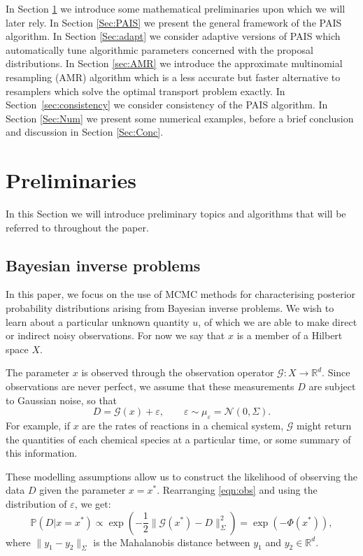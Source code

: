 \documentclass[final]{siamltex}
\newcommand{\G}{\mathcal{G}}
\newcommand{\data}{D}
\begin{document}
In Section \ref{Sec:Prelim} we introduce some mathematical
preliminaries upon which we will later rely. In Section \ref{Sec:PAIS}
we present the general framework of the PAIS algorithm. In Section
\ref{Sec:adapt} we consider adaptive versions of PAIS which
automatically tune algorithmic parameters concerned with the proposal
distributions. In Section \ref{sec:AMR} we introduce the approximate
multinomial resampling (AMR) algorithm which is a less accurate but
faster alternative to resamplers which solve the optimal transport
problem exactly. In Section~\ref{sec:consistency} we consider
consistency of the PAIS algorithm. In Section \ref{Sec:Num} we present
some numerical examples, before a brief conclusion and discussion in
Section \ref{Sec:Conc}.

\section{Preliminaries}\label{Sec:Prelim}
In this Section we will introduce preliminary topics and algorithms
that will be referred to throughout the paper.
\subsection{Bayesian inverse problems}
In this paper, we focus on the use of MCMC methods for characterising
posterior probability distributions arising from Bayesian inverse problems. We
wish to learn about a particular unknown quantity $u$, of which we are
able to make direct or indirect noisy observations. For now
we say that $x$ is a member of a Hilbert
space $X$. 

The parameter $x$ is observed
through the observation operator $\mathcal{G}:X \to\mathbb{R}^d$. 
Since observations are never perfect, we
assume that these measurements $\data$ are subject to Gaussian noise,
so that
\begin{equation}\label{eqn:obs}
	\data = \mathcal{G}(x) + \varepsilon, \qquad \varepsilon \sim \mu_{\varepsilon} = \mathcal{N}(0,\Sigma).
\end{equation}
For example, if $x$ are the rates of reactions in a chemical system, $\G$ might
return the quantities of each chemical species at a particular time, or some
summary of this information.

These modelling assumptions allow us to construct the 
likelihood of observing the data $\data$ given the parameter $x =
x^*$. Rearranging \eqref{eqn:obs} and using the distribution of
$\varepsilon$, we get:
\begin{equation}\label{eqn:like}
	\mathbb{P}(\data|x=x^*) \propto \exp \left ( -\frac{1}{2} \|\mathcal{G}(x^*)
	  - \data\|_\Sigma^2 \right ) = \exp\left(-\Phi(x^*)\right),
\end{equation}
where $\| y_1 - y_2 \|_\Sigma$ is the Mahalanobis distance between $y_1$ and $y_2 \in \mathbb{R}^d$.
\end{document}
